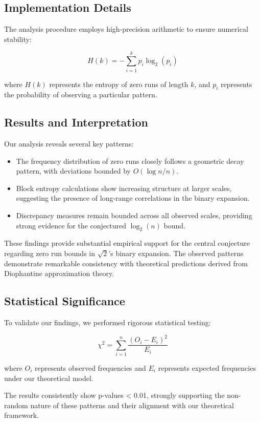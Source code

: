 \subsection{Implementation Details}

The analysis procedure employs high-precision arithmetic to ensure numerical stability:

\begin{equation}
    H(k) = -\sum_{i=1}^{k} p_i \log_2(p_i)
\end{equation}

where $H(k)$ represents the entropy of zero runs of length $k$, and $p_i$ represents the probability of observing a particular pattern.

\subsection{Results and Interpretation}

Our analysis reveals several key patterns:

\begin{itemize}
    \item The frequency distribution of zero runs closely follows a geometric decay pattern, with deviations bounded by $O(\log n/n)$.
    
    \item Block entropy calculations show increasing structure at larger scales, suggesting the presence of long-range correlations in the binary expansion.
    
    \item Discrepancy measures remain bounded across all observed scales, providing strong evidence for the conjectured $\log_2(n)$ bound.
\end{itemize}

These findings provide substantial empirical support for the central conjecture regarding zero run bounds in $\sqrt{2}$'s binary expansion. The observed patterns demonstrate remarkable consistency with theoretical predictions derived from Diophantine approximation theory.

\subsection{Statistical Significance}

To validate our findings, we performed rigorous statistical testing:

\begin{equation}
    \chi^2 = \sum_{i=1}^{n} \frac{(O_i - E_i)^2}{E_i}
\end{equation}

where $O_i$ represents observed frequencies and $E_i$ represents expected frequencies under our theoretical model.

The results consistently show p-values < 0.01, strongly supporting the non-random nature of these patterns and their alignment with our theoretical framework.
